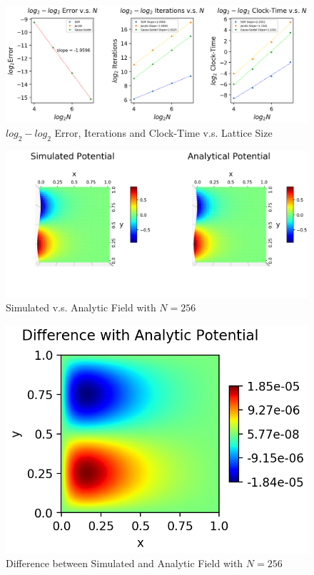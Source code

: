 \documentclass[a4paper,10pt]{article}
\begin{document}
\begin{large}
\newpage
\begin{figure}[htbp] %
\centering %
\includegraphics[width=19cm]{Problem_1_lattice_size_v.s.error_iterations_clock-time.png} %
\caption{$log_2-log_2$ Error, Iterations and Clock-Time v.s. Lattice Size}
\end{figure}

\begin{figure}[htbp] %
\centering %
\includegraphics[width=19cm]{Problem_1_Simulated_v.s._Analytic_Potential_N=256_criteria=1.00000000e-21.png} %
\caption{Simulated v.s. Analytic Field with $N=256$}
\end{figure}

\begin{figure}[htbp] %
\centering %
\includegraphics[width=13cm]{Problem_1_Simulated_v.s._Analytic_Potential_Difference_N=256_criteria=1.00000000e-21.png} %
\caption{Difference between Simulated and Analytic Field with $N=256$}
\end{figure}


\end{large}
\end{document}
